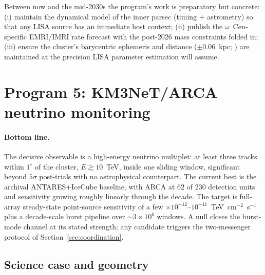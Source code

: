 \documentclass[11pt]{article}
\newcommand{\ocen}{\ensuremath{\omega}~Cen}
\begin{document}
Between now and the mid-2030s the program's work is preparatory but concrete: (i) maintain the dynamical model of the inner parsec (timing + astrometry) so that any LISA source has an immediate host context; (ii) publish the \ocen-specific EMRI/IMRI rate forecast with the post-2026 mass constraints folded in; (iii) ensure the cluster's barycentric ephemeris and distance ($\pm$0.06~kpc; \citealt{Haberle2025oMEGACatVI}) are maintained at the precision LISA parameter estimation will assume.

\section{Program 5: KM3NeT/ARCA neutrino monitoring}
\label{sec:neutrino}

\paragraph{Bottom line.} The decisive observable is a high-energy neutrino multiplet: at least three tracks within $1^{\circ}$ of the cluster, $E \gtrsim 10$~TeV, inside one sliding window, significant beyond $5\sigma$ post-trials with no astrophysical counterpart. The current best is the archival ANTARES+IceCube baseline, with ARCA at 62 of 230 detection units and sensitivity growing roughly linearly through the decade. The target is full-array steady-state point-source sensitivity of a few $\times10^{-12}$--$10^{-11}$~TeV~cm$^{-2}$~s$^{-1}$ plus a decade-scale burst pipeline over $\sim3\times10^{6}$ windows. A null closes the burst-mode channel at its stated strength; any candidate triggers the two-messenger protocol of Section~\ref{sec:coordination}.

\subsection{Science case and geometry}
\end{document}
